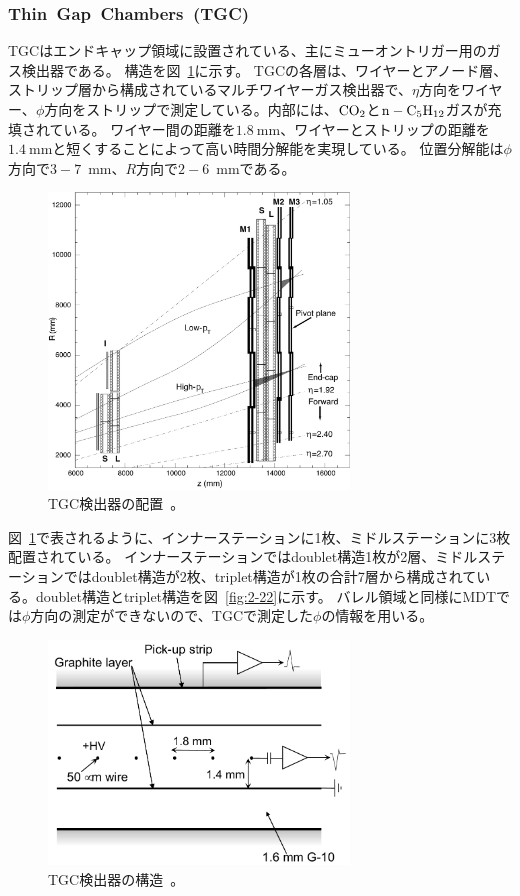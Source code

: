 \subsubsection{Thin~Gap~Chambers~(TGC)}
TGCはエンドキャップ領域に設置されている、主にミューオントリガー用のガス検出器である。
構造を図~\ref{fig:2-20}に示す。
TGCの各層は、ワイヤーとアノード層、ストリップ層から構成されているマルチワイヤーガス検出器で、$\eta$方向をワイヤー、$\phi$方向をストリップで測定している。内部には、$\rm{CO_{2}}$と$\rm{n - C_{5}H_{12}}$ガスが充填されている。
ワイヤー間の距離を$\SI{1.8}{\mm}$、ワイヤーとストリップの距離を$\SI{1.4}{\mm}$と短くすることによって高い時間分解能を実現している。
位置分解能は$\phi$方向で$3-7$~$\si{\mm}$、$R$方向で$2-6$~$\si{\mm}$である。

\begin{figure}[h]
  \centering
  \includegraphics[clip, width=8cm]{fig/2/l1mue-schema.pdf}
  \caption{TGC検出器の配置~\cite{Aad:1129811}。}
  \label{fig:2-20}
\end{figure}

図~\ref{fig:2-20}で表されるように、インナーステーションに1枚、ミドルステーションに3枚配置されている。
インナーステーションではdoublet構造1枚が2層、ミドルステーションではdoublet構造が2枚、triplet構造が1枚の合計7層から構成されている。doublet構造とtriplet構造を図~\ref{fig:2-22}に示す。
バレル領域と同様にMDTでは$\phi$方向の測定ができないので、TGCで測定した$\phi$の情報を用いる。

\begin{figure}[h]
  \centering
  \includegraphics[clip, width=8cm]{fig/2/TGC_anode_wire.pdf}
  \caption{TGC検出器の構造~\cite{Aad:1129811}。}
  \label{fig:2-21}
\end{figure}

